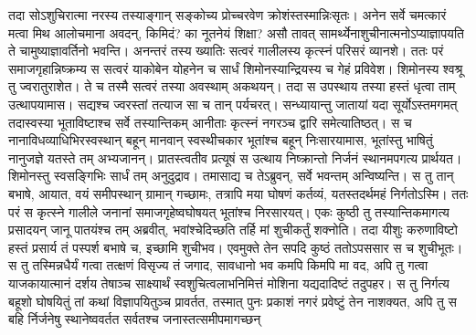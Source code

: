 \vakya तदा सोऽशुचिरात्मा नरस्य तस्याङ्गान् सङ्कोच्य प्रोच्चरवेण क्रोशंस्तस्मान्निःसृतः।
\vakya अनेन सर्वे चमत्कारं मत्वा मिथ आलोचमाना अवदन्, किमिदं? का नूतनेयं शिक्षा? असौ तावत् सामर्थ्येनाशुचीनात्मनोऽप्याज्ञापयति ते चामुष्याज्ञावर्तिनो भवन्ति।
\vakya अनन्तरं तस्य ख्यातिः सत्वरं गालीलस्य कृत्स्नं परिसरं व्यानशे।
\vakya ततः परं समाजगृहान्निष्क्रम्य स सत्वरं याकोबेन योहनेन च सार्धं शिमोनस्यान्द्रियस्य च गेहं प्रविवेश।
\vakya शिमोनस्य श्वश्रू तु ज्वरातुराशेत। ते च तस्मै सत्वरं तस्या अवस्थाम् अकथयन्।
\vakya तदा स उपस्थाय तस्या हस्तं धृत्वा ताम् उत्थापयामास। सद्यश्च ज्वरस्तां तत्याज सा च तान् पर्यचरत्।
\vakya सन्ध्यायान्तु जातायां यदा सूर्योऽस्तमगमत् तदास्वस्या भूताविष्टाश्च सर्वे तस्यान्तिकम् आनीताः
\vakya कृत्स्नं नगरञ्च द्वारि समेत्यातिष्ठत्।
\vakya स च नानाविधव्याधिभिरस्वस्थान् बहून् मानवान् स्वस्थीचकार भूतांश्च बहून् निःसारयामास, भूतांस्तु भाषितुं नानुजज्ञे यतस्ते तम् अभ्यजानन्।
\vakya प्रातस्त्वतीव प्रत्यूषं स उत्थाय निष्क्रान्तो निर्जनं स्थानमपगत्य प्रार्थयत।
\vakya शिमोनस्तु स्वसङ्गिभिः सार्धं तम् अनुदुद्राव।
\vakya तमासाद्य च तेऽब्रुवन्, सर्वे भवन्तम् अन्विष्यन्ति।
\vakya स तु तान् बभाषे, आयात, वयं समीपस्थान् ग्रामान् गच्छामः, तत्रापि मया घोषणं कर्तव्यं, यतस्तदर्थमहं निर्गतोऽस्मि।
\vakya ततः परं स कृत्स्ने गालीले जनानां समाजगृहेष्वघोषयत् भूतांश्च निरसारयत्।
\vakya एकः कुष्ठी तु तस्यान्तिकमागत्य प्रसादयन् जानू पातयंश्च तम् अब्रवीत्, भवांश्चेदिच्छति तर्हि मां शुचीकर्तुं शक्नोति।
\vakya तदा यीशुः करुणाविष्टो हस्तं प्रसार्य तं पस्पर्श बभाषे च, इच्छामि शुचीभव।
\vakya एवमुक्ते तेन सपदि कुष्ठं ततोऽपससार स च शुचीभूतः।
\vakya स तु तस्मिन्नधैर्यं गत्वा तत्क्षणं विसृज्य तं जगाद,
\vakya सावधानो भव कमपि किमपि मा वद, अपि तु गत्वा याजकायात्मानं दर्शय तेषाञ्च साक्ष्यार्थं स्वशुचित्वलाभनिमित्तं मोशिना यद्यदादिष्टं तदुपहर।
\vakya स तु निर्गत्य बहूशो घोषयितुं तां कथां विज्ञापयितुञ्च प्रावर्तत, तस्मात् पुनः प्रकाशं नगरं प्रवेष्टुं तेन नाशक्यत, अपि तु स बहि र्निर्जनेषु स्थानेष्ववर्तत सर्वतश्च जनास्तत्समीपमागच्छन्\eoc